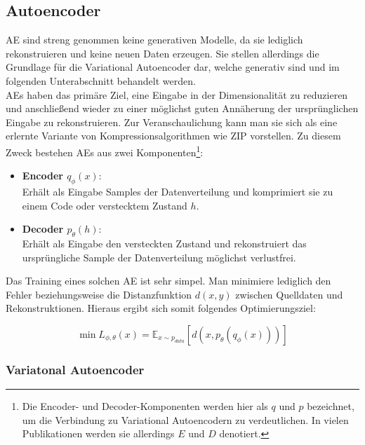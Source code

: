 \subsection{Autoencoder}

\ac{AE} sind streng genommen keine generativen Modelle, da sie lediglich rekonstruieren und keine neuen Daten erzeugen. Sie stellen allerdings die Grundlage für die Variational Autoencoder dar, welche generativ sind und im folgenden Unterabschnitt behandelt werden. \\ 
\ac{AE}s haben das primäre Ziel, eine Eingabe in der Dimensionalität zu reduzieren und anschließend wieder zu einer möglichst guten Annäherung der ursprünglichen Eingabe zu rekonstruieren. Zur Veranschaulichung kann man sie sich als eine erlernte Variante von Kompressionsalgorithmen wie ZIP vorstellen. 
Zu diesem Zweck bestehen \ac{AE}s aus zwei Komponenten\footnote{
    Die Encoder- und Decoder-Komponenten werden hier als $q$ und $p$ bezeichnet, um die Verbindung zu Variational Autoencodern zu verdeutlichen. In vielen Publikationen werden sie allerdings $E$ und $D$ denotiert.    
}:
\begin{itemize}
    \item \textbf{Encoder $q_\phi(x)$}: \\
    Erhält als Eingabe Samples der Datenverteilung und komprimiert sie zu einem Code oder verstecktem Zustand $h$.
    \item \textbf{Decoder $p_\theta(h)$}: \\
    Erhält als Eingabe den versteckten Zustand und rekonstruiert das ursprüngliche Sample der Datenverteilung möglichst verlustfrei.
\end{itemize}

Das Training eines solchen \ac{AE} ist sehr simpel. Man minimiere lediglich den Fehler beziehungsweise die Distanzfunktion $d(x, y)$ zwischen Quelldaten und Rekonstruktionen. Hieraus ergibt sich somit folgendes Optimierungsziel:

\begin{equation}
    \min L_{\phi, \theta}(x) = \mathbb E _{x \sim p_{data}} 
    \left [ 
        d(x, p_\theta(q_\phi(x)))
    \right ]
\end{equation}

\subsubsection{Variatonal Autoencoder}

